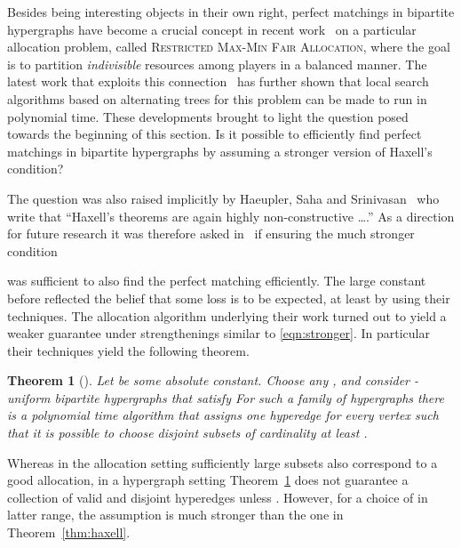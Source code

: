 \documentclass[11pt]{article}
\newtheorem{theorem}{Theorem}[section]
\theoremstyle{definition}
\theoremstyle{remark}
\newcommand{\problemmacro}[1]{\texorpdfstring{\textsc{#1}}{#1}\xspace}
\begin{document}
Besides being interesting objects in their own right, perfect
matchings in bipartite hypergraphs have become a crucial concept in
recent
work~\cite{bansal2006santa,feige2008allocations,haeupler2011new,asadpour2012santa,svensson2012santa,polacek2012quasi,DBLP:conf/soda/AnnamalaiKS15}
on a particular allocation problem, called \problemmacro{Restricted
  Max-Min Fair Allocation}, where the goal is to partition
\emph{indivisible} resources among players in a balanced manner. The
latest work that exploits this
connection~\cite{DBLP:conf/soda/AnnamalaiKS15} has further shown that
local search algorithms based on alternating trees for this problem
can be made to run in polynomial time. These developments brought to
light the question posed towards the beginning of this section. Is it
possible to efficiently find perfect matchings in bipartite
hypergraphs by assuming a stronger version of Haxell's condition?

The question was also raised implicitly by Haeupler, Saha and
Srinivasan~\cite{haeupler2011new} who write that ``Haxell's theorems
are again highly non-constructive \ldots.'' As a direction for future
research it was therefore asked in~\cite{DBLP:conf/soda/AnnamalaiKS15} if
ensuring the much stronger condition

was sufficient to also find the perfect matching efficiently. The
large constant before  reflected the belief that some loss is to be
expected, at least by using their techniques. The allocation algorithm
underlying their work turned out to yield a weaker guarantee under
strengthenings similar to \eqref{eqn:stronger}. In particular
their techniques yield the following theorem.

\begin{theorem}[\cite{DBLP:conf/soda/AnnamalaiKS15}]\label{thm:weak}
  Let  be some absolute constant. Choose any
  ,  and consider -uniform bipartite
  hypergraphs  that satisfy
   For such a family of
  hypergraphs there is a polynomial time algorithm that assigns one
  hyperedge  for every vertex  such that it is
  possible to choose disjoint subsets
   of cardinality at least
  .
\end{theorem}

Whereas in the allocation setting sufficiently large subsets
 also correspond to a good allocation, in a
hypergraph setting Theorem~\ref{thm:weak} does not guarantee a
collection of valid and disjoint hyperedges unless .
However, for a choice of  in latter range, the assumption
 is much stronger than the
one in Theorem~\ref{thm:haxell}.
\end{document}
